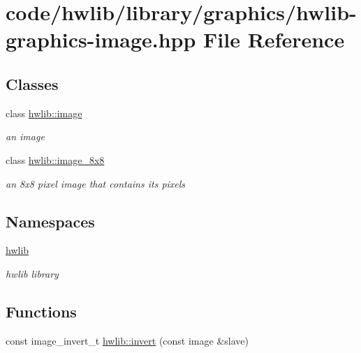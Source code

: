 \hypertarget{hwlib-graphics-image_8hpp}{}\section{code/hwlib/library/graphics/hwlib-\/graphics-\/image.hpp File Reference}
\label{hwlib-graphics-image_8hpp}
\subsection*{Classes}
\begin{DoxyCompactItemize}
\item 
class \hyperlink{classhwlib_1_1image}{hwlib\+::image}
\begin{DoxyCompactList}\small\item\em an image \end{DoxyCompactList}\item 
class \hyperlink{classhwlib_1_1image__8x8}{hwlib\+::image\+\_\+8x8}
\begin{DoxyCompactList}\small\item\em an 8x8 pixel image that contains its pixels \end{DoxyCompactList}\end{DoxyCompactItemize}
\subsection*{Namespaces}
\begin{DoxyCompactItemize}
\item 
 \hyperlink{namespacehwlib}{hwlib}
\begin{DoxyCompactList}\small\item\em hwlib library \end{DoxyCompactList}\end{DoxyCompactItemize}
\subsection*{Functions}
\begin{DoxyCompactItemize}
\item 
const image\+\_\+invert\+\_\+t \hyperlink{namespacehwlib_ab619d7f70bb62112b2a04192f5103a24}{hwlib\+::invert} (const image \&slave)
\end{DoxyCompactItemize}
